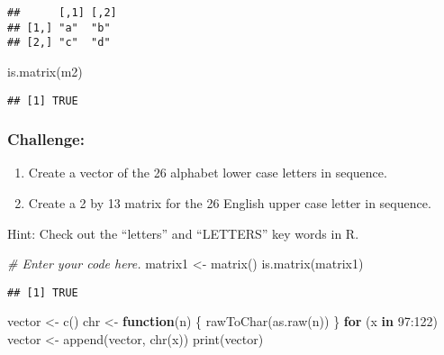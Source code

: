 \documentclass[
]{article}
\newenvironment{Shaded}{\begin{snugshade}}{\end{snugshade}}
\newcommand{\CommentTok}[1]{\textcolor[rgb]{0.56,0.35,0.01}{\textit{#1}}}
\newcommand{\ControlFlowTok}[1]{\textcolor[rgb]{0.13,0.29,0.53}{\textbf{#1}}}
\newcommand{\DecValTok}[1]{\textcolor[rgb]{0.00,0.00,0.81}{#1}}
\newcommand{\FunctionTok}[1]{\textcolor[rgb]{0.00,0.00,0.00}{#1}}
\newcommand{\NormalTok}[1]{#1}
\newcommand{\OtherTok}[1]{\textcolor[rgb]{0.56,0.35,0.01}{#1}}
\newcommand{\SpecialCharTok}[1]{\textcolor[rgb]{0.00,0.00,0.00}{#1}}
\providecommand{\tightlist}{%
  \setlength{\itemsep}{0pt}\setlength{\parskip}{0pt}}
\begin{document}
\begin{verbatim}
##      [,1] [,2]
## [1,] "a"  "b" 
## [2,] "c"  "d"
\end{verbatim}

\begin{Shaded}
\begin{Highlighting}[]
\FunctionTok{is.matrix}\NormalTok{(m2)}
\end{Highlighting}
\end{Shaded}

\begin{verbatim}
## [1] TRUE
\end{verbatim}

\hypertarget{challenge-1}{%
\subsubsection{Challenge:}\label{challenge-1}}

\begin{enumerate}
\def\labelenumi{\arabic{enumi}.}
\tightlist
\item
  Create a vector of the 26 alphabet lower case letters in sequence.
\item
  Create a 2 by 13 matrix for the 26 English upper case letter in
  sequence.
\end{enumerate}

Hint: Check out the ``letters'' and ``LETTERS'' key words in R.

\begin{Shaded}
\begin{Highlighting}[]
\CommentTok{\# Enter your code here.}
\NormalTok{matrix1 }\OtherTok{\textless{}{-}} \FunctionTok{matrix}\NormalTok{()}
\FunctionTok{is.matrix}\NormalTok{(matrix1)}
\end{Highlighting}
\end{Shaded}

\begin{verbatim}
## [1] TRUE
\end{verbatim}

\begin{Shaded}
\begin{Highlighting}[]
\NormalTok{vector }\OtherTok{\textless{}{-}} \FunctionTok{c}\NormalTok{()}
\NormalTok{chr }\OtherTok{\textless{}{-}} \ControlFlowTok{function}\NormalTok{(n) \{ }\FunctionTok{rawToChar}\NormalTok{(}\FunctionTok{as.raw}\NormalTok{(n)) \}}
\ControlFlowTok{for}\NormalTok{ (x }\ControlFlowTok{in} \DecValTok{97}\SpecialCharTok{:}\DecValTok{122}\NormalTok{)}
\NormalTok{  vector }\OtherTok{\textless{}{-}} \FunctionTok{append}\NormalTok{(vector, }\FunctionTok{chr}\NormalTok{(x))}
\FunctionTok{print}\NormalTok{(vector)}
\end{Highlighting}
\end{Shaded}
\end{document}
